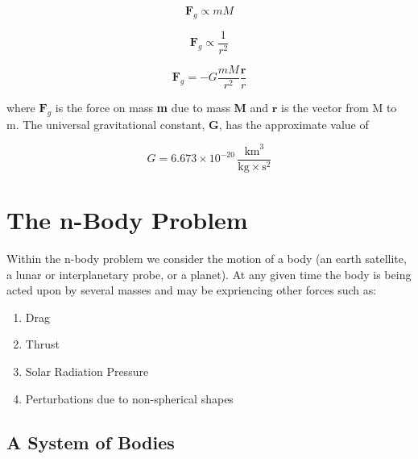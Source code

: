 \documentclass[11pt]{article}
\begin{document}
    \begin{equation}
        \mathbf{F}_{g} \propto m M
        \label{eq:gravitational_force_proportion}
    \end{equation}

    \begin{equation}
        \mathbf{F}_{g} \propto \frac{1}{r^2}
        \label{eq:gravitational_force_distance}
    \end{equation}

    \begin{equation}
        \mathbf{F}_{g} = -G \frac{m M}{r^2} \frac{\mathbf{r}}{r}
        \label{eq:gravitational_force}
    \end{equation}

    where $\mathbf{F}_{g}$ is the force on mass \textbf{m} due to mass \textbf{M} and $\mathbf{r}$ is the vector from
    M to m.  The universal gravitational constant, \textbf{G}, has the approximate value of

    \begin{equation}
        G = 6.673 \times 10^{-20} \, \frac{\text{km}^3}{\text{kg} \times \text{s}^{2}}
    \end{equation}

    \section{The n-Body Problem}

    Within the n-body problem we consider the motion of a body (an earth satellite, a lunar or interplanetary probe, or
    a planet).  At any given time the body is being acted upon by several masses and may be expriencing other forces
    such as:

    \begin{enumerate}[label=\alph*)]
        \item Drag
        \item Thrust
        \item Solar Radiation Pressure
        \item Perturbations due to non-spherical shapes
    \end{enumerate}

    \subsection{A System of Bodies}
\end{document}
